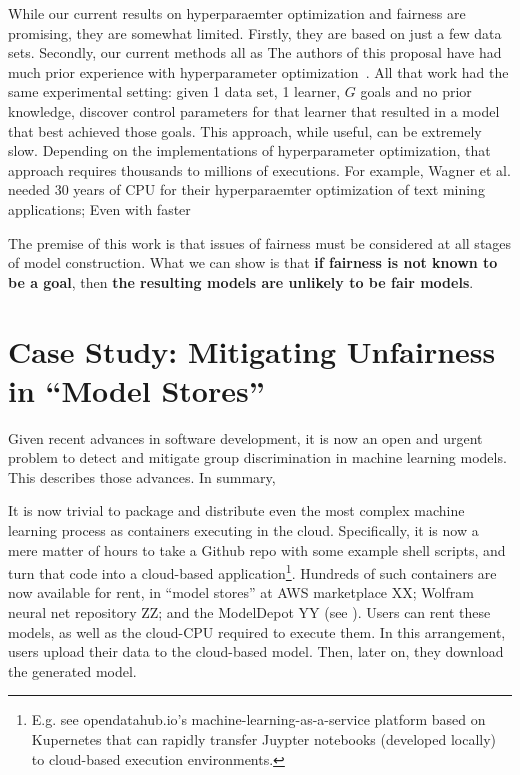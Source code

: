 While our current results on hyperparaemter optimization and fairness are promising, they are somewhat limited. Firstly, they are based on just a  few data sets. Secondly,
our current methods all as
The authors of this proposal have had much prior experience with hyperparameter optimization~\cite{XXX}. All that work
had the same experimental setting: given 1 data set, 1 learner,  $G$ goals and no prior knowledge,
 discover  control parameters for that learner that resulted in a model that best achieved those goals. This approach, while useful, can be extremely slow. Depending on the  implementations of hyperparameter optimization, that approach requires thousands to millions of executions. For example,   Wagner et al. needed 30 years of CPU for their hyperparaemter optimization of text mining applications; Even with faster
 
The premise of this work is that issues of fairness must be considered at all stages
of model construction. What we can show is that
{\bf if fairness is not known to be a goal}, then {\bf the resulting models are unlikely to be fair models}.
\section{Case Study: Mitigating Unfairness in ``Model Stores''}
Given recent advances in software development,
it is now an open and 
urgent problem to detect and mitigate
  group discrimination in machine learning models.
  This describes those advances. In summary,
  
  
  
  It is now trivial to package and distribute even
  the most complex machine learning process
  as containers executing in the cloud.
   Specifically,
   it is now a mere matter of hours to take a Github repo with some example shell  scripts, and turn that code into a cloud-based application\footnote{E.g. see opendatahub.io's machine-learning-as-a-service platform based on Kupernetes that can rapidly transfer Juypter notebooks (developed locally)  to cloud-based
  execution environments.}.
  Hundreds of
  such containers are now available for rent, in
  ``model stores'' at  AWS marketplace XX;
  Wolfram neural net repository ZZ;  and  the  ModelDepot YY
(see ).  Users can
rent these models, as well as the cloud-CPU required
to execute them. In this arrangement, users upload their data to the cloud-based model. Then, later on,
they download the generated model. 

